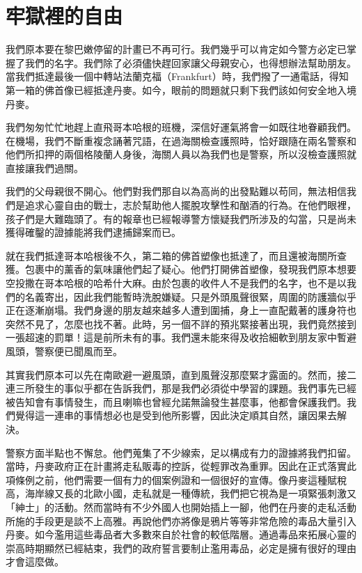 \chapter{牢獄裡的自由}

我們原本要在黎巴嫩停留的計畫已不再可行。我們幾乎可以肯定如今警方必定已掌握了我們的名字。我們除了必須儘快趕回家讓父母親安心，也得想辦法幫助朋友。當我們抵達最後一個中轉站法蘭克福（Frankfurt）時，我們撥了一通電話，得知第一箱的佛首像已經抵達丹麥。如今，眼前的問題就只剩下我們該如何安全地入境丹麥。

我們匆匆忙忙地趕上直飛哥本哈根的班機，深信好運氣將會一如既往地眷顧我們。在機場，我們不斷重複念誦著咒語，在過海關檢查護照時，恰好跟隨在兩名警察和他們所扣押的兩個格陵蘭人身後，海關人員以為我們也是警察，所以沒檢查護照就直接讓我們過關。

我們的父母親很不開心。他們對我們那自以為高尚的出發點難以苟同，無法相信我們是追求心靈自由的戰士，志於幫助他人擺脫攻擊性和酗酒的行為。在他們眼裡，孩子們是大難臨頭了。有的報章也已經報導警方懷疑我們所涉及的勾當，只是尚未獲得確鑿的證據能將我們逮捕歸案而已。

就在我們抵達哥本哈根後不久，第二箱的佛首塑像也抵達了，而且還被海關所查獲。包裹中的薰香的氣味讓他們起了疑心。他們打開佛首塑像，發現我們原本想要空投撒在哥本哈根的哈希什大麻。由於包裹的收件人不是我們的名字，也不是以我們的名義寄出，因此我們能暫時洗脫嫌疑。只是外頭風聲很緊，周圍的防護牆似乎正在逐漸崩塌。我們身邊的朋友越來越多人遭到圍捕，身上一直配戴著的護身符也突然不見了，怎麼也找不著。此時，另一個不詳的預兆緊接著出現，我們竟然接到一張超速的罰單！這是前所未有的事。我們還未能來得及收拾細軟到朋友家中暫避風頭，警察便已聞風而至。

其實我們原本可以先在南歐避一避風頭，直到風聲沒那麼緊才露面的。然而，接二連三所發生的事似乎都在告訴我們，那是我們必須從中學習的課題。我們事先已經被告知會有事情發生，而且喇嘛也曾經允諾無論發生甚麼事，他都會保護我們。我們覺得這一連串的事情想必也是受到他所影響，因此決定順其自然，讓因果去解決。

警察方面半點也不懈怠。他們蒐集了不少線索，足以構成有力的證據將我們扣留。當時，丹麥政府正在計畫將走私販毒的控訴，從輕罪改為重罪。因此在正式落實此項條例之前，他們需要一個有力的個案例證和一個很好的宣傳。像丹麥這種賦稅高，海岸線又長的北歐小國，走私就是一種傳統，我們把它視為是一項緊張刺激又「紳士」的活動。然而當時有不少外國人也開始插上一腳，他們在丹麥的走私活動所施的手段更是談不上高雅。再說他們亦將像是鴉片等等非常危險的毒品大量引入丹麥。如今濫用這些毒品者大多數來自於社會的較低階層。通過毒品來拓展心靈的崇高時期顯然已經結束，我們的政府誓言要制止濫用毒品，必定是擁有很好的理由才會這麼做。

